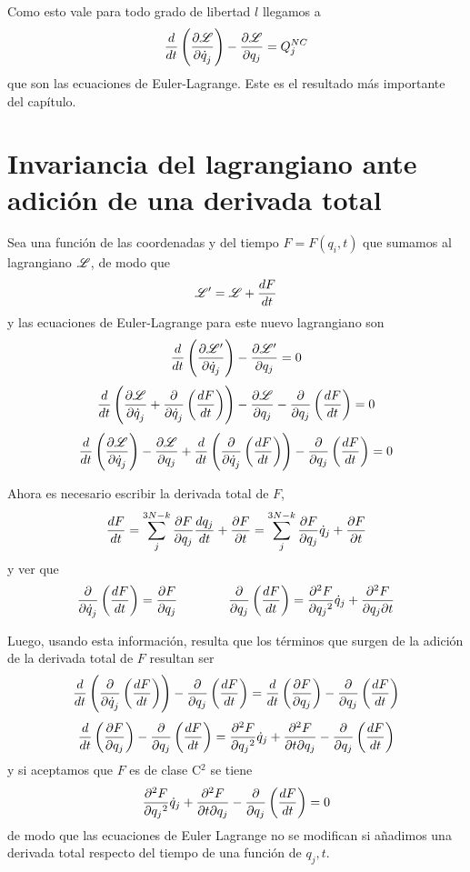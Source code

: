 \documentclass[10pt,oneside]{CBFT_article}
\begin{document}
Como esto vale para todo grado de libertad $l$ llegamos a
\[
\frac{d}{dt} \left( \dpar{\Lag}{\dot{q}_j} \right) -  \dpar{\Lag}{q_j} = Q_j^{NC}
\]
que son las ecuaciones de Euler-Lagrange. Este es el resultado más importante del capítulo.

\section{Invariancia del lagrangiano ante adición de una derivada total}

Sea una función de las coordenadas y del tiempo $F=F(q_i,t)$ que sumamos al lagrangiano $\Lag$, de modo que
\[
\Lag'=\Lag + \dtot{F}{t} 
\]
y las ecuaciones de Euler-Lagrange para este nuevo lagrangiano son
\[
\frac{d}{dt}\left(\dpar{\Lag'}{\dot{q}_j}\right) - \dpar{\Lag'}{q_j} = 0
\]
\[
\dtot{}{t}\left(\dpar{\Lag}{\dot{q}_j} + \dpar{}{\dot{q}_j}\left(\dtot{F}{t}\right)\right) -
\dpar{\Lag}{q_j} - \dpar{}{q_j}\left( \dtot{F}{t}\right) = 0 
\]
\[
\dtot{}{t}\left(\dpar{\Lag}{\dot{q}_j}\right) - \dpar{\Lag}{q_j} + 
\dtot{}{t}\left(\dpar{}{\dot{q}_j}\left(\dtot{F}{t}\right)\right) 
- \dpar{}{q_j}\left( \dtot{F}{t}\right) = 0 
\]

Ahora es necesario escribir la derivada total de $F$,
\[
\dtot{F}{t} = 	\sum_j^{3N-k} \dpar{F}{q_j}\dtot{q_j}{t} + \dpar{F}{t} =
			\sum_j^{3N-k} \dpar{F}{q_j}\dot{q}_j + \dpar{F}{t}
\]
y ver que
\[
\dpar{}{\dot{q}_j}\left(\dtot{F}{t}\right) = \dpar{F}{q_j} \qquad\qquad
\dpar{}{q_j}\left(\dtot{F}{t}\right) = \dpar[2]{F}{q_j} \dot{q}_j + \dparcru{F}{t}{q_j} 
\]

Luego, usando esta información, resulta que los términos que surgen de la adición de la derivada total de $F$ resultan 
ser
\[
\dtot{}{t}\left( \dpar{}{\dot{q}_j}\left(\dtot{F}{t}\right)\right) - \dpar{}{q_j}\left( \dtot{F}{t}\right) = 
\dtot{}{t}\left( \dpar{F}{q_j} \right) - \dpar{}{q_j}\left( \dtot{F}{t}\right)
\]
\[
\dtot{}{t}\left( \dpar{F}{q_j} \right) - \dpar{}{q_j}\left( \dtot{F}{t}\right) =
\dpar[2]{F}{q_j} \dot{q}_j + \dparcru{F}{q_j}{t} - \dpar{}{q_j}\left( \dtot{F}{t}\right)
\]
y si aceptamos que $F$ es de clase C$^2$ se tiene
\[
\dpar[2]{F}{q_j} \dot{q}_j + \dparcru{F}{q_j}{t} - \dpar{}{q_j}\left( \dtot{F}{t}\right)=0
\]
de modo que las ecuaciones de Euler Lagrange no se modifican si añadimos una derivada total respecto del tiempo de una 
función de $q_j,t$.
\end{document}
